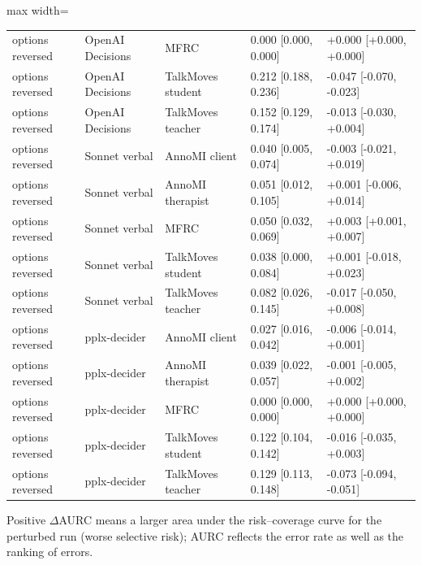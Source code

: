 \begin{table}[t]
\begin{adjustbox}{max width=\linewidth}
\begin{tabular}{lllll}
options reversed & OpenAI Decisions & MFRC & 0.000 [0.000, 0.000] & +0.000 [+0.000, +0.000] \\
options reversed & OpenAI Decisions & TalkMoves student & 0.212 [0.188, 0.236] & -0.047 [-0.070, -0.023] \\
options reversed & OpenAI Decisions & TalkMoves teacher & 0.152 [0.129, 0.174] & -0.013 [-0.030, +0.004] \\
options reversed & Sonnet verbal & AnnoMI client & 0.040 [0.005, 0.074] & -0.003 [-0.021, +0.019] \\
options reversed & Sonnet verbal & AnnoMI therapist & 0.051 [0.012, 0.105] & +0.001 [-0.006, +0.014] \\
options reversed & Sonnet verbal & MFRC & 0.050 [0.032, 0.069] & +0.003 [+0.001, +0.007] \\
options reversed & Sonnet verbal & TalkMoves student & 0.038 [0.000, 0.084] & +0.001 [-0.018, +0.023] \\
options reversed & Sonnet verbal & TalkMoves teacher & 0.082 [0.026, 0.145] & -0.017 [-0.050, +0.008] \\
options reversed & pplx-decider & AnnoMI client & 0.027 [0.016, 0.042] & -0.006 [-0.014, +0.001] \\
options reversed & pplx-decider & AnnoMI therapist & 0.039 [0.022, 0.057] & -0.001 [-0.005, +0.002] \\
options reversed & pplx-decider & MFRC & 0.000 [0.000, 0.000] & +0.000 [+0.000, +0.000] \\
options reversed & pplx-decider & TalkMoves student & 0.122 [0.104, 0.142] & -0.016 [-0.035, +0.003] \\
options reversed & pplx-decider & TalkMoves teacher & 0.129 [0.113, 0.148] & -0.073 [-0.094, -0.051] \\
\bottomrule
\end{tabular}
\end{adjustbox}
\par\smallskip\footnotesize\raggedright Positive $\Delta$AURC means a larger area under the risk--coverage curve for the perturbed run (worse selective risk); AURC reflects the error rate as well as the ranking of errors.
\end{table}
